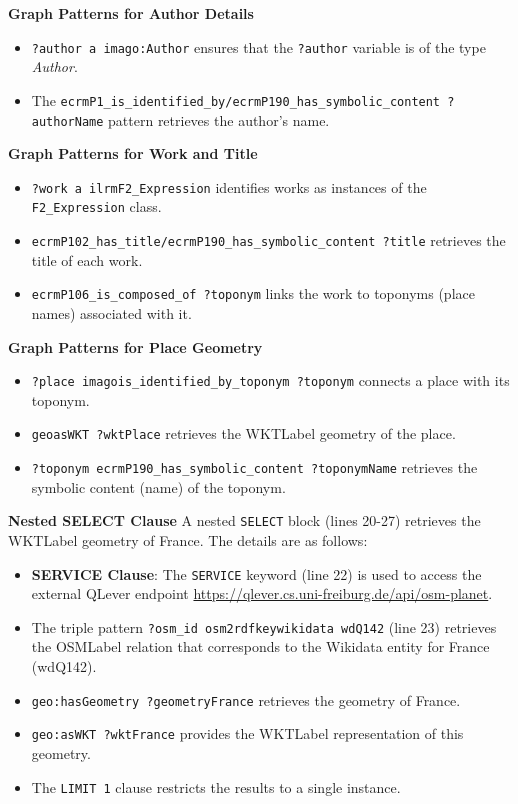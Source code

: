\textbf{Graph Patterns for Author Details}
\begin{itemize}
    \item \texttt{?author a imago:Author} ensures that the \texttt{?author} variable is of the type \textit{Author}.
    \item The \texttt{\gls{ecrm}P1\_is\_identified\_by/\gls{ecrm}P190\_has\_symbolic\_content ?authorName} pattern retrieves the author’s name.
\end{itemize}

\textbf{Graph Patterns for Work and Title}
\begin{itemize}
    \item \texttt{?work a \gls{ilrm}F2\_Expression} identifies works as instances of the \\ \texttt{F2\_Expression} class.
    \item \texttt{\gls{ecrm}P102\_has\_title/\gls{ecrm}P190\_has\_symbolic\_content ?title} retrieves the title of each work.
    \item \texttt{\gls{ecrm}P106\_is\_composed\_of ?toponym} links the work to toponyms (place names) associated with it.
\end{itemize}

\textbf{Graph Patterns for Place Geometry}
\begin{itemize}
    \item \texttt{?place \gls{imago}is\_identified\_by\_toponym ?toponym} connects a place with its toponym.
    \item \texttt{\gls{geo}asWKT ?wktPlace} retrieves the \acrshort{WKTLabel} geometry of the place.
    \item \texttt{?toponym \gls{ecrm}P190\_has\_symbolic\_content ?toponymName} retrieves the symbolic content (name) of the toponym.
\end{itemize}

\textbf{Nested SELECT Clause}
A nested \texttt{SELECT} block (lines 20-27) retrieves the \acrshort{WKTLabel} geometry of France. The details are as follows:
\begin{itemize}
    \item \textbf{SERVICE Clause}: The \texttt{SERVICE} keyword (line 22) is used to access the external QLever endpoint \url{https://qlever.cs.uni-freiburg.de/api/osm-planet}.
    \item The triple pattern \texttt{?osm\_id \gls{osm2rdfkey}wikidata \gls{wd}Q142} (line 23) retrieves the \acrshort{OSMLabel} relation that corresponds to the Wikidata entity for France (\gls{wd}Q142).
    \item \texttt{geo:hasGeometry ?geometryFrance} retrieves the geometry of France.
    \item \texttt{geo:asWKT ?wktFrance} provides the \acrshort{WKTLabel} representation of this geometry.
    \item The \texttt{LIMIT 1} clause restricts the results to a single instance.
\end{itemize}

